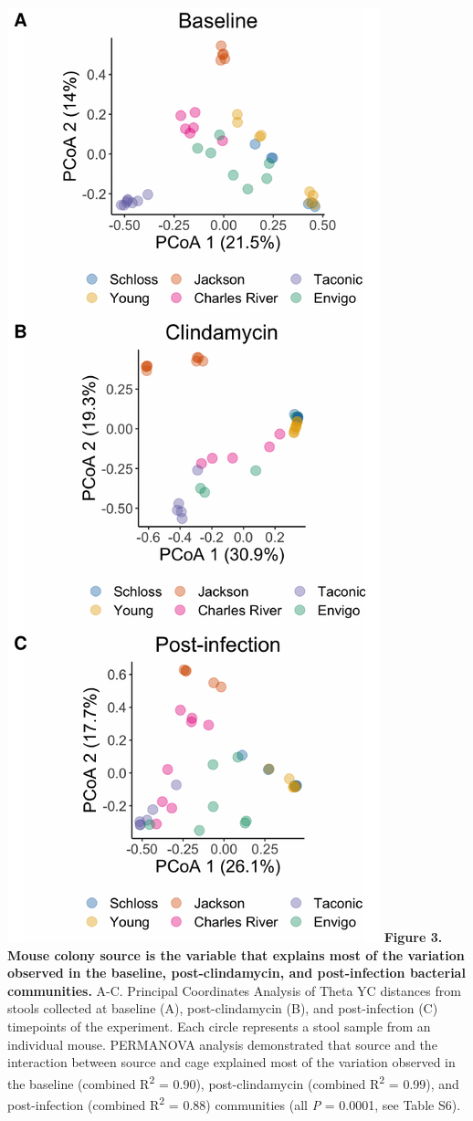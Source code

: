 \documentclass[11pt,]{article}
\begin{document}
\includegraphics{figure_3.pdf} \textbf{Figure 3. Mouse colony source is
the variable that explains most of the variation observed in the
baseline, post-clindamycin, and post-infection bacterial communities.}
A-C. Principal Coordinates Analysis of Theta YC distances from stools
collected at baseline (A), post-clindamycin (B), and post-infection (C)
timepoints of the experiment. Each circle represents a stool sample from
an individual mouse. PERMANOVA analysis demonstrated that source and the
interaction between source and cage explained most of the variation
observed in the baseline (combined R\textsuperscript{2} = 0.90),
post-clindamycin (combined R\textsuperscript{2} = 0.99), and
post-infection (combined R\textsuperscript{2} = 0.88) communities (all
\emph{P} = 0.0001, see Table S6).
\end{document}
